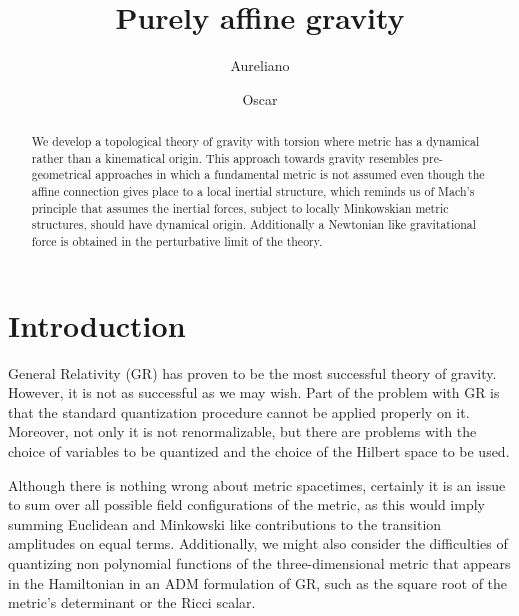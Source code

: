 \documentclass[twocolumn,
  showpacs,showkeys,prd,superscriptaddress]{revtex4-1}
\begin{document}
\title{Purely affine gravity}


\author{Aureliano }

\author{Oscar }

\begin{abstract}
  We develop a topological theory of gravity with torsion where metric has a dynamical rather than a kinematical origin. This approach towards gravity resembles pre-geometrical approaches in which a fundamental metric is not assumed even though the  affine connection gives place to a local inertial structure, which reminds us of Mach's principle that assumes the inertial forces, subject to locally Minkowskian metric structures, should have dynamical origin. Additionally a Newtonian like gravitational force is obtained in the perturbative limit of the theory.
\end{abstract}


\maketitle

\section{Introduction}

General Relativity (GR) has proven to be the most successful theory of gravity.  However,  it is not as successful as we may wish. Part of the problem with GR is that the standard quantization procedure cannot be applied  properly on it. Moreover, not only it is not renormalizable, but there are  problems with the choice of variables to be quantized and the choice of the Hilbert space to be used. 

Although there is nothing wrong about metric spacetimes,  certainly it is an issue to sum over all possible field configurations of the metric, as this would imply summing Euclidean and Minkowski like contributions to the transition amplitudes on equal terms. Additionally, we might also consider the difficulties of  quantizing  non polynomial functions of the three-dimensional metric that appears in the Hamiltonian in an ADM formulation of GR, such as the square root of the metric's determinant or the Ricci scalar.
\end{document}
